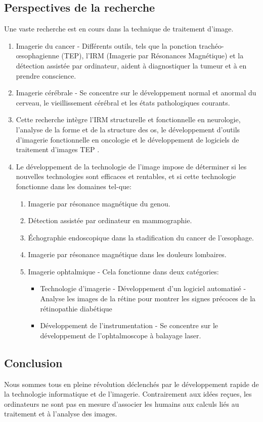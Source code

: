 \documentclass[12pt]{article}
\begin{document}
\subsection{Perspectives de la recherche}
Une vaste recherche est en cours dans la technique de traitement d'image.
\begin{enumerate}
	\item Imagerie du cancer - Différents outils, tels que la ponction trachéo-œsophagienne (TEP), l'IRM (Imagerie par Résonances Magnétique) et la détection assistée par ordinateur, aident à diagnostiquer la tumeur et à en prendre conscience.
	\item Imagerie cérébrale - Se concentre sur le développement normal et anormal du cerveau, le vieillissement cérébral et les états pathologiques courants.
	\item Cette recherche intègre l'IRM structurelle et fonctionnelle en neurologie, l'analyse de la forme et de la structure des os, le développement d'outils d'imagerie fonctionnelle en oncologie et le développement de logiciels de traitement d'images TEP \cite{25}.
	\item Le développement de la technologie de l'image impose de déterminer si les nouvelles technologies sont efficaces et rentables, et si cette technologie fonctionne dans les domaines tel-que:
	\begin{enumerate}
		\item Imagerie par résonance magnétique du genou.
		\item Détection assistée par ordinateur en mammographie.
		\item Échographie endoscopique dans la stadification du cancer de l'œsophage.
		\item Imagerie par résonance magnétique dans les douleurs lombaires.
		\item Imagerie ophtalmique - Cela fonctionne dans deux catégories:
		\begin{itemize}
			\item Technologie d'imagerie - Développement d'un logiciel automatisé - Analyse les images de la rétine pour montrer les signes précoces de la rétinopathie diabétique
			\item Développement de l'instrumentation - Se concentre sur le développement de l'ophtalmoscope à balayage laser.
		\end{itemize}
	\end{enumerate}
\end{enumerate}

\subsection{Conclusion}
Nous sommes tous en pleine révolution déclenchés par le développement rapide de la technologie informatique et de l'imagerie. Contrairement aux idées reçues, les ordinateurs ne sont pas en mesure d’associer les humains aux calculs liés au traitement et à l’analyse des images.
\end{document}
